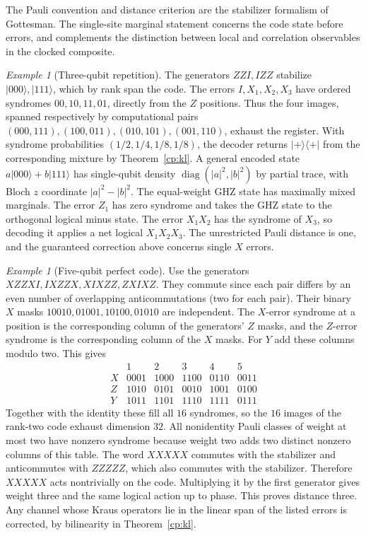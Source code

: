 \documentclass[aps,pra,onecolumn,superscriptaddress,nofootinbib,10pt]{revtex4-2}
\theoremstyle{definition}
\theoremstyle{remark}
\newtheorem{example}[theorem]{Example}
\begin{document}
The Pauli convention and distance criterion are the stabilizer formalism of Gottesman. The single-site marginal statement concerns the code state before errors, and complements the distinction between local and correlation observables in the clocked composite. \cite{n5-gottesman}

\begin{example}[Three-qubit repetition]\label{cp:rep}
The generators $ZZI,IZZ$ stabilize $|000\rangle,|111\rangle$, which by rank span the code. The errors $I,X_1,X_2,X_3$ have ordered syndromes $00,10,11,01$, directly from the $Z$ positions. Thus the four images, spanned respectively by computational pairs $(000,111),(100,011),(010,101),(001,110)$, exhaust the register. With syndrome probabilities $(1/2,1/4,1/8,1/8)$, the decoder returns $|+\rangle\langle+|$ from the corresponding mixture by Theorem~\ref{cp:kl}. A general encoded state $a|000\rangle+b|111\rangle$ has single-qubit density $\operatorname{diag}(|a|^2,|b|^2)$ by partial trace, with Bloch $z$ coordinate $|a|^2-|b|^2$. The equal-weight GHZ state has maximally mixed marginals. The error $Z_1$ has zero syndrome and takes the GHZ state to the orthogonal logical minus state. The error $X_1 X_2$ has the syndrome of $X_3$, so decoding it applies a net logical $X_1X_2X_3$. The unrestricted Pauli distance is one, and the guaranteed correction above concerns single $X$ errors.
\end{example}

\begin{example}[Five-qubit perfect code]\label{cp:five}
Use the generators $XZZXI,IXZZX,XIXZZ,ZXIXZ$. They commute since each pair differs by an even number of overlapping anticommutations (two for each pair). Their binary $X$ masks $10010,01001,10100,01010$ are independent. The $X$-error syndrome at a position is the corresponding column of the generators' $Z$ masks, and the $Z$-error syndrome is the corresponding column of the $X$ masks. For $Y$ add these columns modulo two. This gives
\[
\begin{array}{c|ccccc}
 &1&2&3&4&5\\\hline
 X&0001&1000&1100&0110&0011\\
 Z&1010&0101&0010&1001&0100\\
 Y&1011&1101&1110&1111&0111
\end{array}
\]
Together with the identity these fill all $16$ syndromes, so the $16$ images of the rank-two code exhaust dimension $32$. All nonidentity Pauli classes of weight at most two have nonzero syndrome because weight two adds two distinct nonzero columns of this table. The word $XXXXX$ commutes with the stabilizer and anticommutes with $ZZZZZ$, which also commutes with the stabilizer. Therefore $XXXXX$ acts nontrivially on the code. Multiplying it by the first generator gives weight three and the same logical action up to phase. This proves distance three. Any channel whose Kraus operators lie in the linear span of the listed errors is corrected, by bilinearity in Theorem~\ref{cp:kl}. \cite{n5-five-ref,n5-gottesman}
\end{example}
\end{document}
